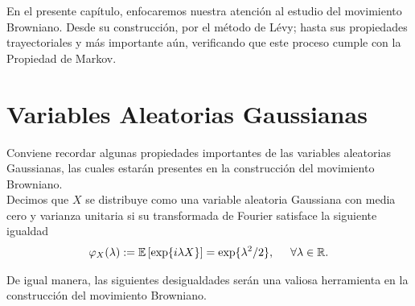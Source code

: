 En el presente capítulo, enfocaremos nuestra atención al estudio del movimiento Browniano. Desde su construcción, por el método de Lévy; hasta sus propiedades trayectoriales y más importante aún, verificando que este proceso cumple con la Propiedad de Markov. \\

\section{Variables Aleatorias Gaussianas}
Conviene recordar algunas propiedades importantes de las variables aleatorias Gaussianas, las cuales estarán presentes en la construcción del movimiento Browniano. \\

Decimos que $X$ se distribuye como una variable aleatoria Gaussiana con media cero y varianza unitaria si su transformada de Fourier satisface la siguiente igualdad
	\begin{align*}
	\varphi_X (\lambda) := \mathbb{E}\left[ \exp \{ i \lambda X \} \right] = \exp \{ \lambda^2/2 \}, \hspace{0.5cm} \forall \lambda \in \mathbb{R}.
	\end{align*}
	
De igual manera, las siguientes desigualdades serán una valiosa herramienta en la construcción del movimiento Browniano.

